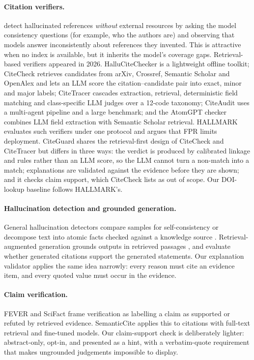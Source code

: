 \documentclass[10pt,twocolumn,a4paper]{article}
\newcommand{\cg}{CiteGuard}
\begin{document}
\paragraph{Citation verifiers.}
\citet{agrawal2024hallucinating} detect hallucinated references \emph{without} external resources by
asking the model consistency questions (for example, who the authors are) and observing that models
answer inconsistently about references they invented. This is attractive when no index is
available, but it inherits the model's coverage gaps. Retrieval-based verifiers appeared in
2026. HalluCiteChecker \citep{sakai2026hallucitechecker} is a lightweight offline toolkit; CiteCheck
\citep{khajavi2026citecheck} retrieves candidates from arXiv, Crossref, Semantic Scholar and OpenAlex
and lets an LLM score the citation--candidate pair into exact, minor and major labels; CiteTracer
\citep{li2026source} cascades extraction, retrieval, deterministic field matching and class-specific
LLM judges over a 12-code taxonomy; CiteAudit \citep{shi2026citeaudit} uses a multi-agent pipeline
and a large benchmark; and the AtomGPT checker \citep{neralla2026hallucination} combines LLM field
extraction with Semantic Scholar retrieval. HALLMARK \citep{kim2026hallmark} evaluates such verifiers
under one protocol and argues that FPR limits deployment. \cg{} shares the retrieval-first design of
CiteCheck and CiteTracer but differs in three ways: the verdict is produced by calibrated linkage and
rules rather than an LLM score, so the LLM cannot turn a non-match into a match; explanations are
validated against the evidence before they are shown; and it checks claim support, which CiteCheck
lists as out of scope. Our DOI-lookup baseline follows HALLMARK's.

\paragraph{Hallucination detection and grounded generation.}
General hallucination detectors compare samples for self-consistency \citep{manakul2023selfcheckgpt}
or decompose text into atomic facts checked against a knowledge source \citep{min2023factscore}.
Retrieval-augmented generation grounds outputs in retrieved passages \citep{lewis2020retrieval}, and
\citet{gao2023enabling} evaluate whether generated citations support the generated statements. Our
explanation validator applies the same idea narrowly: every reason must cite an evidence item, and
every quoted value must occur in the evidence.

\paragraph{Claim verification.}
FEVER \citep{thorne2018fever} and SciFact \citep{wadden2020fact} frame verification as labelling a
claim as supported or refuted by retrieved evidence. SemanticCite \citep{haan2025semanticcite}
applies this to citations with full-text retrieval and fine-tuned models. Our claim-support check is
deliberately lighter: abstract-only, opt-in, and presented as a hint, with a verbatim-quote
requirement that makes ungrounded judgements impossible to display.
\end{document}
